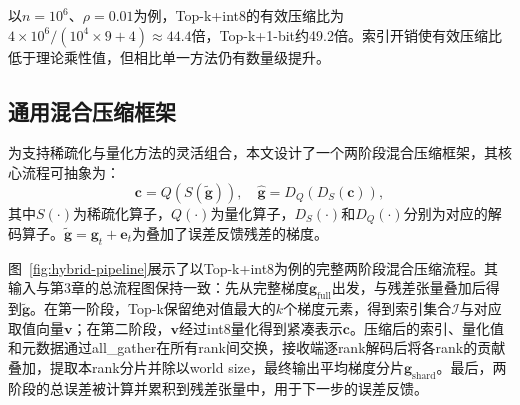 以\(n = 10^6\)、\(\rho = 0.01\)为例，Top-k+int8的有效压缩比为\(4 \times 10^6 / (10^4 \times 9 + 4) \approx 44.4\)倍，Top-k+1-bit约49.2倍。索引开销使有效压缩比低于理论乘性值，但相比单一方法仍有数量级提升。

\subsection{通用混合压缩框架}

为支持稀疏化与量化方法的灵活组合，本文设计了一个两阶段混合压缩框架，其核心流程可抽象为：
\begin{equation}
\mathbf{c} = Q(S(\tilde{\mathbf{g}})), \quad \hat{\mathbf{g}} = D_Q(D_S(\mathbf{c})),
\label{eq:hybrid-abstract}
\end{equation}
其中\(S(\cdot)\)为稀疏化算子，\(Q(\cdot)\)为量化算子，\(D_S(\cdot)\)和\(D_Q(\cdot)\)分别为对应的解码算子。\(\tilde{\mathbf{g}} = \mathbf{g}_t + \mathbf{e}_t\)为叠加了误差反馈残差的梯度。

图~\ref{fig:hybrid-pipeline}展示了以Top-k+int8为例的完整两阶段混合压缩流程。其输入与第3章的总流程图保持一致：先从完整梯度\(\mathbf{g}_{\text{full}}\)出发，与残差张量叠加后得到\(\tilde{\mathbf{g}}\)。在第一阶段，Top-k保留绝对值最大的\(k\)个梯度元素，得到索引集合\(\mathcal{I}\)与对应取值向量\(\mathbf{v}\)；在第二阶段，\(\mathbf{v}\)经过int8量化得到紧凑表示\(\mathbf{c}\)。压缩后的索引、量化值和元数据通过all\_gather在所有rank间交换，接收端逐rank解码后将各rank的贡献叠加，提取本rank分片并除以world size，最终输出平均梯度分片\(\mathbf{g}_{\text{shard}}\)。最后，两阶段的总误差被计算并累积到残差张量中，用于下一步的误差反馈。

